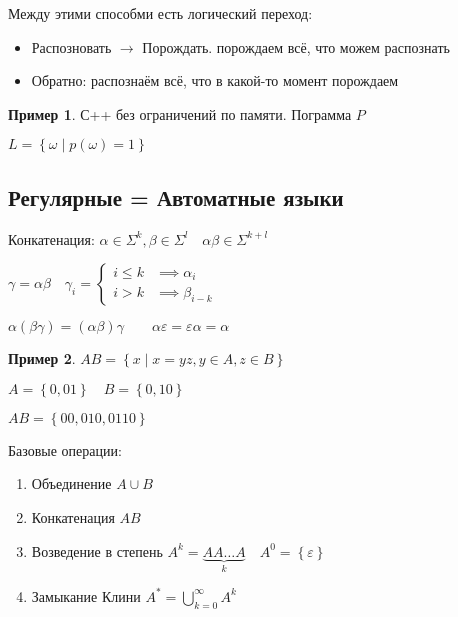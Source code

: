 \documentclass{book}
\theoremstyle{definition}
\newtheorem*{example}{Пример}
\begin{document}
Между этими способми есть логический переход:
\begin{itemize}
    \item Распозновать $\to $ Порождать. порождаем всё, что можем распознать
    \item Обратно: распознаём всё, что в какой-то момент порождаем
\end{itemize}

\begin{example}
    С++ без ограничений по памяти. Пограмма $P$

    $L = \left\{\omega \mid p(\omega)=1  \right\} $

\end{example}

\subsection{Регулярные = Автоматные языки}

\begin{definition}
    Конкатенация: $\alpha\in\Sigma^k, \beta\in \Sigma^l\quad \alpha\beta\in \Sigma^{k+l}$

     $\gamma = \alpha\beta\quad \gamma_i =\begin{cases}
         i\leqslant k&\implies \alpha_i\\
         i>k&\implies \beta_{i-k}
     \end{cases}$ 

     $\alpha(\beta\gamma) = \left( \alpha\beta \right) \gamma\qquad \alpha\varepsilon = \varepsilon\alpha = \alpha$
\end{definition}

\begin{example}
    $AB = \left\{ x \mid x = yz, y\in A, z\in B \right\} $ 

    $A = \left\{ 0,01 \right\} \quad B = \left\{ 0,10 \right\} $

    $AB = \left\{ 00,010,0110 \right\} $
\end{example}

Базовые операции:
\begin{enumerate}
    \item Объединение $A\cup B$
    \item Конкатенация $AB$
    \item[] Возведение в степень  $A^k = \underbrace{AA\ldots A}_k\quad A^0 = \left\{ \varepsilon \right\} $ 
    \item Замыкание Клини $A^* = \bigcup\limits_{k=0}^{\infty }A^k$
\end{enumerate}
\end{document}
